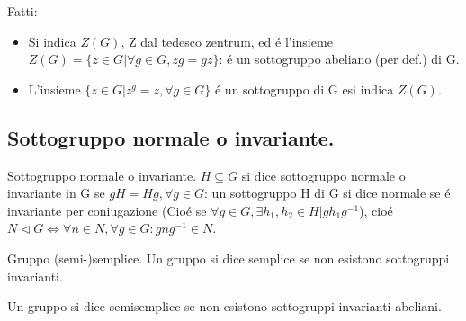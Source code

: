 \documentclass[oneside,12pt]{memoir}
\begin{document}
Fatti:

\begin{itemize}
\item Si indica $Z(G)$, Z dal tedesco zentrum, ed \'e l'insieme $Z(G)=\{ z\in G | \forall g\in G, zg=gz \}$: \'e un sottogruppo abeliano (per def.) di G.
\item L'insieme $\{ z\in G| z^g=z, \forall g \in G \}$ \'e un sottogruppo di G esi indica $Z(G)$.

\end{itemize}


\subsection{Sottogruppo normale o invariante.}

\begin{definition}{Sottogruppo normale o invariante.}
$H\subseteq G$ si dice sottogruppo normale o invariante in G se $gH=Hg , \forall g\in G$: un sottogruppo H di G si dice normale se \'e invariante per coniugazione (Cio\'e se $\forall g \in G, \exists h_1,h_2 \in H | gh_1g^{-1}$), cio\'e $N\triangleleft G \iff \forall n\in N,\forall g\in G: gng^{-1}\in N$.
\end{definition}

\begin{definition}{Gruppo (semi-)semplice.}
Un gruppo si dice semplice se non esistono sottogruppi invarianti.

Un gruppo si dice semisemplice se non esistono sottogruppi invarianti abeliani.
\end{definition}
\end{document}

